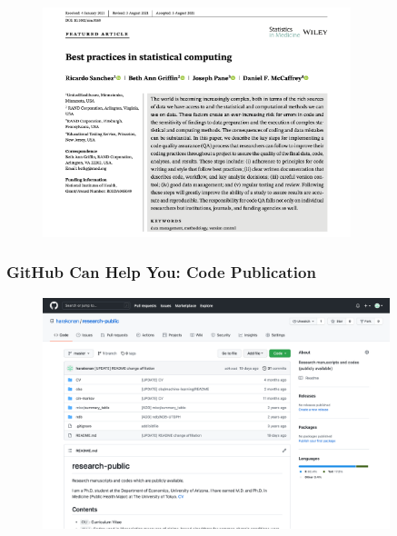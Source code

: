 \documentclass[aspectratio=169, 12pt]{beamer}
\begin{document}
	\begin{frame}
	\begin{figure}
	\includegraphics[width=0.8\textwidth]{fig/Sanchez_title.png}
	\end{figure}

	\end{frame}

	\begin{frame}
	\frametitle{GitHub Can Help You: Code Publication}
	\begin{figure}
	\includegraphics[width=0.9\textwidth]{fig/github_public.png}
	\end{figure}

	\end{frame}
\end{document}
